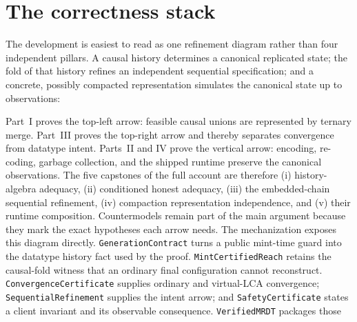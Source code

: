 \documentclass[11pt]{article}
\newcommand{\lean}[1]{\texttt{#1}}
\begin{document}
\section*{The correctness stack}
The development is easiest to read as one refinement diagram rather than four
independent pillars.  A causal history determines a canonical replicated
state; the fold of that history refines an independent sequential
specification; and a concrete, possibly compacted representation simulates the
canonical state up to observations:
\begin{center}
\end{center}
Part~I proves the top-left arrow: feasible causal unions are represented by
ternary merge.  Part~III proves the top-right arrow and thereby separates
convergence from datatype intent.  Parts~II and IV prove the vertical arrow:
encoding, re-coding, garbage collection, and the shipped runtime preserve the
canonical observations.  The five capstones of the full account are therefore
(i) history-algebra adequacy, (ii) conditioned honest adequacy, (iii) the
embedded-chain sequential refinement, (iv) compaction representation
independence, and (v) their runtime composition.  Countermodels remain part of
the main argument because they mark the exact hypotheses each arrow needs.
The mechanization exposes this diagram directly. \lean{GenerationContract}
turns a public mint-time guard into the datatype history fact used by the
proof. \lean{MintCertifiedReach} retains the causal-fold witness that an
ordinary final configuration cannot reconstruct. \lean{ConvergenceCertificate}
supplies ordinary and virtual-LCA convergence; \lean{SequentialRefinement}
supplies the intent arrow; and \lean{SafetyCertificate} states a client
invariant and its observable consequence. \lean{VerifiedMRDT} packages those
\end{document}
